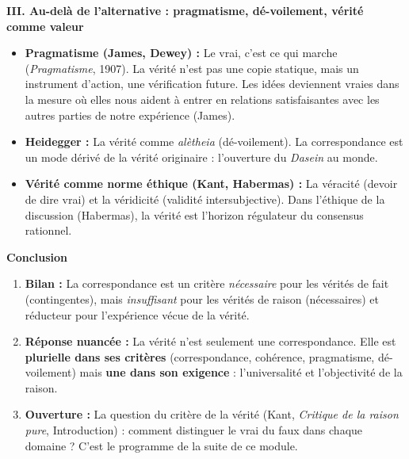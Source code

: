 \documentclass[11pt]{article}
\newcommand{\cle}[1]{{\popxbold\color{popdark}#1}}
\begin{document}
\begin{exoresolu}
\textbf{III. Au-delà de l'alternative : pragmatisme, dé-voilement, vérité comme valeur}
\begin{itemize}
    \item \textbf{Pragmatisme (James, Dewey) :} \guillemotleft Le vrai, c'est ce qui marche \guillemotright (\emph{Pragmatisme}, 1907). La vérité n'est pas une copie statique, mais un instrument d'action, une \cle{vérification} future. \guillemotleft Les idées deviennent vraies dans la mesure où elles nous aident à entrer en relations satisfaisantes avec les autres parties de notre expérience \guillemotright (James).
    \item \textbf{Heidegger :} La vérité comme \emph{alètheia} (dé-voilement). La correspondance est un mode dérivé de la vérité originaire : l'ouverture du \emph{Dasein} au monde.
    \item \textbf{Vérité comme norme éthique (Kant, Habermas) :} La \cle{véracité} (devoir de dire vrai) et la \cle{véridicité} (validité intersubjective). Dans l'éthique de la discussion (Habermas), la vérité est l'horizon régulateur du consensus rationnel.
\end{itemize}

\textbf{Conclusion}
\begin{enumerate}
    \item \textbf{Bilan :} La correspondance est un critère \emph{nécessaire} pour les vérités de fait (contingentes), mais \emph{insuffisant} pour les vérités de raison (nécessaires) et réducteur pour l'expérience vécue de la vérité.
    \item \textbf{Réponse nuancée :} La vérité n'est \guillemotleft seulement \guillemotright une correspondance. Elle est \textbf{plurielle dans ses critères} (correspondance, cohérence, pragmatisme, dé-voilement) mais \textbf{une dans son exigence} : l'universalité et l'objectivité de la raison.
    \item \textbf{Ouverture :} La question du \guillemotleft critère de la vérité \guillemotright (Kant, \emph{Critique de la raison pure}, Introduction) : comment distinguer le vrai du faux dans chaque domaine ? C'est le programme de la suite de ce module.
\end{enumerate}
\end{exoresolu}
\end{document}
